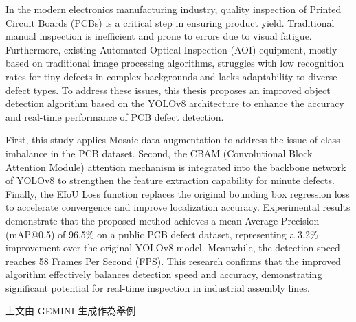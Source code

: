 In the modern electronics manufacturing industry, quality inspection of Printed Circuit Boards (PCBs) is a critical step in ensuring product yield. Traditional manual inspection is inefficient and prone to errors due to visual fatigue. Furthermore, existing Automated Optical Inspection (AOI) equipment, mostly based on traditional image processing algorithms, struggles with low recognition rates for tiny defects in complex backgrounds and lacks adaptability to diverse defect types. To address these issues, this thesis proposes an improved object detection algorithm based on the YOLOv8 architecture to enhance the accuracy and real-time performance of PCB defect detection.

First, this study applies Mosaic data augmentation to address the issue of class imbalance in the PCB dataset. Second, the CBAM (Convolutional Block Attention Module) attention mechanism is integrated into the backbone network of YOLOv8 to strengthen the feature extraction capability for minute defects. Finally, the EIoU Loss function replaces the original bounding box regression loss to accelerate convergence and improve localization accuracy. Experimental results demonstrate that the proposed method achieves a mean Average Precision (mAP@0.5) of 96.5\% on a public PCB defect dataset, representing a 3.2\% improvement over the original YOLOv8 model. Meanwhile, the detection speed reaches 58 Frames Per Second (FPS). This research confirms that the improved algorithm effectively balances detection speed and accuracy, demonstrating significant potential for real-time inspection in industrial assembly lines.

上文由 GEMINI 生成作為舉例